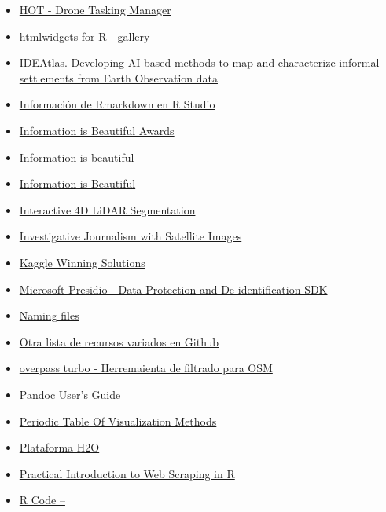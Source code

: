 \documentclass[
  letterpaper,
  DIV=11,
  numbers=noendperiod]{scrartcl}
\begin{document}
\begin{itemize}
  \href{https://polyhaven.com/hdris}{HDRIs Images (HDRIs)})
\item
  \href{https://github.com/hotosm/Drone-TM}{HOT - Drone Tasking Manager}
\item
  \href{http://gallery.htmlwidgets.org/}{htmlwidgets for R - gallery}
\item
  \href{https://ideatlas.eu/}{IDEAtlas. Developing AI-based methods to
  map and characterize informal settlements from Earth Observation data}
\item
  \href{http://rmarkdown.rstudio.com/}{Información de Rmarkdown en R
  Studio}
\item
  \href{https://www.informationisbeautifulawards.com/}{Information is
  Beautiful Awards}
\item
  \href{https://informationisbeautiful.net/}{Information is beautiful}
\item
  \href{informationisbeautiful.net/data}{Information is Beautiful}
\item
  \href{https://ilya-fradlin.github.io/Interactive4D/}{Interactive 4D
  LiDAR Segmentation}
\item
  \href{https://bourgoing.com/en/linvestigation-par-satellite/}{Investigative
  Journalism with Satellite Images}
\item
  \href{http://kagglesolutions.com/}{Kaggle Winning Solutions}
\item
  \href{https://microsoft.github.io/presidio/}{Microsoft Presidio - Data
  Protection and De-identification SDK}
\item
  \href{https://speakerd.s3.amazonaws.com/presentations/5e4b07f0d9a94f8e9a29b902bad6ed0b/naming-slides.pdf}{Naming
  files}
\item
  \href{https://github.com/Shujian2015/FreeML}{Otra lista de recursos
  variados en Github}
\item
  \href{https://overpass-turbo.eu/}{overpass turbo - Herremaienta de
  filtrado para OSM}
\item
  \href{http://pandoc.org/MANUAL.html\#templates}{Pandoc User's Guide}
\item
  \href{https://www.visual-literacy.org/periodic_table/periodic_table.html}{Periodic
  Table Of Visualization Methods}
\item
  \href{https://github.com/h2oai}{Plataforma H2O}
\item
  \href{https://blog.rsquaredacademy.com/web-scraping/}{Practical
  Introduction to Web Scraping in R}
\item
  \href{https://www.r-bloggers.com/r-code-best-practices/}{R Code --
}
\end{itemize}
\end{document}
